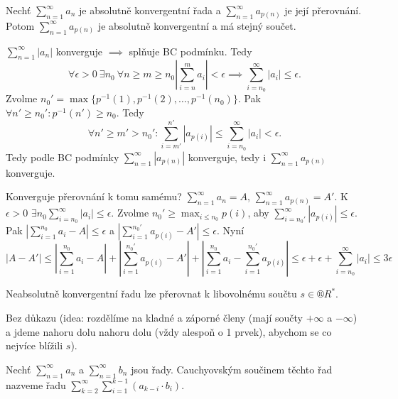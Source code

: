 \documentclass[12pt]{article}                   %
\begin{document}
        \begin{veta}
            Nechť $\sum_{n=1}^∞ a_n$ je absolutně konvergentní řada a $\sum_{n=1}^∞ a_{p(n)}$ je její přerovnání. Potom $\sum_{n=1}^∞ a_{p(n)}$ je absolutně konvergentní a má stejný součet.

            \begin{dukazin}
                $\sum_{n=1}^∞ |a_n|$ konverguje $\implies$ splňuje BC podmínku. Tedy 
                $$ \forall \epsilon > 0\ \exists n_0\ \forall n ≥ m ≥ n_0 |\sum_{i=n}^m a_i| < \epsilon \implies \sum_{i=n_0}^∞ |a_i| ≤ \epsilon. $$
                Zvolme $n_0' = \max\{p^{-1}(1), p^{-1}(2), …, p^{-1}(n_0)\}$. Pak $\forall n'≥ n_0': p^{-1}(n') ≥ n_0$. Tedy
                $$ \forall n' ≥ m' > n_0': \sum_{i=m'}^{n'} |a_{p(i)}| ≤ \sum_{i=n_0}^∞ |a_i| < \epsilon. $$
                Tedy podle BC podmínky $\sum_{n=1}^∞ |a_{p(n)}|$ konverguje, tedy i $\sum_{n=1}^∞ a_{p(n)}$ konverguje.

                Konverguje přerovnání k tomu samému? $\sum_{n=1}^∞ a_n = A$, $\sum_{n=1}^∞ a_{p(n)} = A'$. K $\epsilon > 0$ $\exists n_0 \sum_{i=n_0}^∞ |a_i| ≤ \epsilon$. Zvolme $n_0' ≥ \max_{i ≤ n_0} p(i)$, aby $\sum_{i=n_0'}^∞ |a_{p(i)}| ≤ \epsilon$. Pak $|\sum_{i=1}^{n_0} a_i - A| ≤ \epsilon$ a $|\sum_{i=1}^{n_0'} a_{p(i)} - A'| ≤ \epsilon$. Nyní
                $$ |A - A'| ≤ |\sum_{i=1}^{n_0} a_i - A| + |\sum_{i=1}^{n_0'} a_{p(i)} - A'| + |\sum_{i=1}^{n_0} a_i - \sum_{i=1}^{n_0'} a_{p(i)}| ≤ \epsilon + \epsilon + \sum_{i=n_0}^∞ |a_i| ≤ 3\epsilon $$ 
            \end{dukazin}
        \end{veta}


        \begin{veta}[Riemann]
            Neabsolutně konvergentní řadu lze přerovnat k libovolnému součtu $s \in ®R^*$.

            \begin{dukazin}
                Bez důkazu (idea: rozdělíme na kladné a záporné členy (mají součty $+∞$ a $-∞$) a jdeme nahoru dolu nahoru dolu (vždy alespoň o 1 prvek), abychom se co nejvíce blížili $s$).
            \end{dukazin}
        \end{veta}

        \begin{definice}
            Nechť $\sum_{n=1}^∞ a_n$ a $\sum_{n=1}^∞ b_n$ jsou řady. Cauchyovským součinem těchto řad nazveme řadu $\sum_{k=2}^∞ \sum_{i=1}^{k-1} (a_{k-i}·b_i)$.
        \end{definice}
\end{document}
